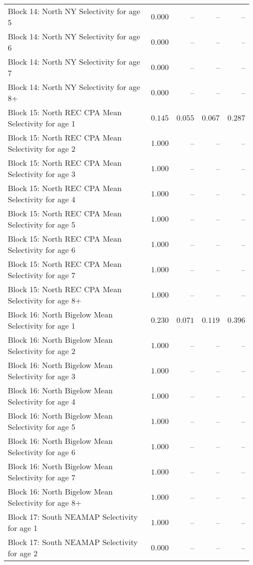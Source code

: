 \documentclass[
]{article}
\begin{document}
\begin{landscape}
\begin{longtable}[t]{lrrrr}
\addlinespace
Block 14: North NY Selectivity for age 5 & $0.000$ & -- & -- & --\\
Block 14: North NY Selectivity for age 6 & $0.000$ & -- & -- & --\\
Block 14: North NY Selectivity for age 7 & $0.000$ & -- & -- & --\\
Block 14: North NY Selectivity for age 8+ & $0.000$ & -- & -- & --\\
Block 15: North REC CPA Mean Selectivity for age 1 & $0.145$ & $0.055$ & $0.067$ & $0.287$\\
\addlinespace
Block 15: North REC CPA Mean Selectivity for age 2 & $1.000$ & -- & -- & --\\
Block 15: North REC CPA Mean Selectivity for age 3 & $1.000$ & -- & -- & --\\
Block 15: North REC CPA Mean Selectivity for age 4 & $1.000$ & -- & -- & --\\
Block 15: North REC CPA Mean Selectivity for age 5 & $1.000$ & -- & -- & --\\
Block 15: North REC CPA Mean Selectivity for age 6 & $1.000$ & -- & -- & --\\
\addlinespace
Block 15: North REC CPA Mean Selectivity for age 7 & $1.000$ & -- & -- & --\\
Block 15: North REC CPA Mean Selectivity for age 8+ & $1.000$ & -- & -- & --\\
Block 16: North Bigelow Mean Selectivity for age 1 & $0.230$ & $0.071$ & $0.119$ & $0.396$\\
Block 16: North Bigelow Mean Selectivity for age 2 & $1.000$ & -- & -- & --\\
Block 16: North Bigelow Mean Selectivity for age 3 & $1.000$ & -- & -- & --\\
\addlinespace
Block 16: North Bigelow Mean Selectivity for age 4 & $1.000$ & -- & -- & --\\
Block 16: North Bigelow Mean Selectivity for age 5 & $1.000$ & -- & -- & --\\
Block 16: North Bigelow Mean Selectivity for age 6 & $1.000$ & -- & -- & --\\
Block 16: North Bigelow Mean Selectivity for age 7 & $1.000$ & -- & -- & --\\
Block 16: North Bigelow Mean Selectivity for age 8+ & $1.000$ & -- & -- & --\\
\addlinespace
Block 17: South NEAMAP Selectivity for age 1 & $1.000$ & -- & -- & --\\
Block 17: South NEAMAP Selectivity for age 2 & $0.000$ & -- & -- & --\\

\end{longtable}
\end{landscape}
\end{document}
